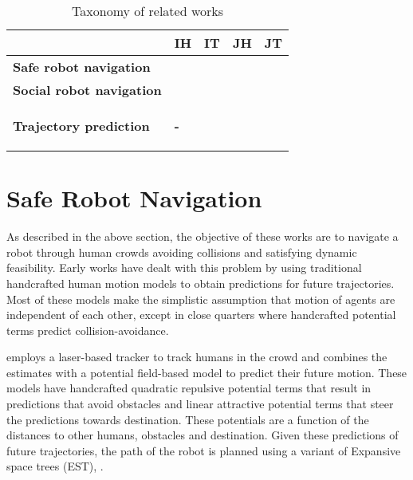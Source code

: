 \begin{table}[H]
  \centering
  \begin{tabular}{|p{5cm}|p{1.5cm}|p{1.5cm}|p{1.5cm}|p{1.5cm}|}
    \hline
     & \textbf{IH} & \textbf{IT} & \textbf{JH} & \textbf{JT}\\
    \hline
    \textbf{Safe robot navigation} & \cite{hoeller2007accompanying} & \cite{aoude2013probabilistically}& \cite{trautman2015robot} & \cite{kim2014brvo} \\
    \hline
    \textbf{Social robot navigation} & \cite{kirby2009companion} & \cite{kim2016socially} & \cite{shiomi2014towards} & \cite{kretzschmar2016socially} \\
    \hline
    \textbf{Trajectory prediction} & \begin{center}{\textbf{-}}\end{center} & \cite{joseph2011bayesian, kitani2012activity} & \cite{luber2010people} & \cite{pellegrini2010improving, alahi16} \\
    \hline
  \end{tabular}
  \caption{Taxonomy of related works}
  \label{tab:taxonomy}
\end{table}

\section{Safe Robot Navigation}
\label{sec:survey-safe-robot-navig-1}

As described in the above section, the objective of these works are to navigate a robot through human crowds avoiding collisions and satisfying dynamic feasibility. Early works have dealt with this problem by using traditional handcrafted human motion models to obtain predictions for future trajectories. Most of these models make the simplistic assumption that motion of agents are independent of each other, except in close quarters where handcrafted potential terms predict collision-avoidance.

\cite{hoeller2007accompanying} employs a laser-based tracker to track humans in the crowd and combines the estimates with a potential field-based model to predict their future motion. These models have handcrafted quadratic repulsive potential terms that result in predictions that avoid obstacles and linear attractive potential terms that steer the predictions towards destination. These potentials are a function of the distances to other humans, obstacles and destination. Given these predictions of future trajectories, the path of the robot is planned using a variant of Expansive space trees (EST), \cite{hsu02}.

